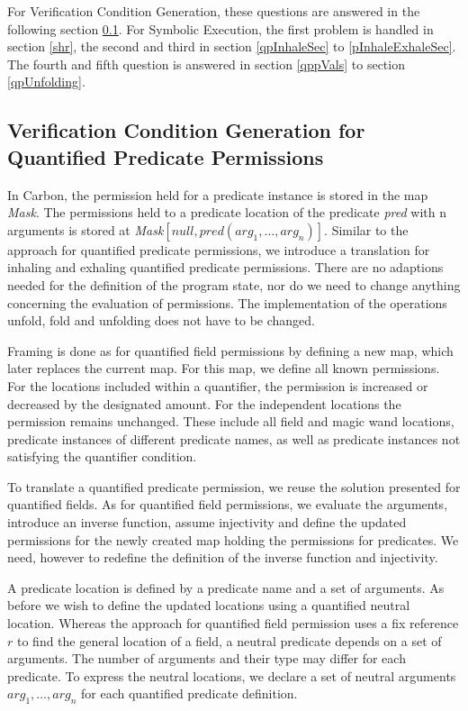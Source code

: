 \documentclass[12pt]{article}
\begin{document}
For Verification Condition Generation, these questions are answered in the following section \ref{vcgPredicate}. For Symbolic Execution, the first problem is handled in section \ref{shr}, the second and third in section \ref{qpInhaleSec} to \ref{pInhaleExhaleSec}. The fourth and fifth question is answered  in section \ref{qppVals} to section \ref{qpUnfolding}.

\subsection{Verification Condition Generation for Quantified Predicate Permissions}
\label{vcgPredicate}
In Carbon, the permission held for a predicate instance is stored in the map \textit{Mask}. The permissions held to a predicate location of the predicate \textit{pred} with n arguments is stored at \textit{Mask}\([null, pred(arg_1, \dots, arg_n)]\). Similar to the approach for quantified predicate permissions, we introduce a translation for inhaling and exhaling quantified predicate permissions. There are no adaptions needed for the definition of the program state, nor do we need to change anything concerning the evaluation of  permissions. The implementation of the operations unfold, fold and unfolding does not have to be changed. 

Framing is done as for quantified field permissions by defining a new map, which later replaces the current map. For this map, we define all known permissions. For the locations included within a quantifier, the permission is increased or decreased by the designated amount. For the independent locations the permission remains unchanged. These include all field and magic wand locations, predicate instances of different predicate names, as well as predicate instances not satisfying the quantifier condition.

To translate a quantified predicate permission, we reuse the solution presented for quantified fields. As for quantified field permissions, we evaluate the arguments, introduce an inverse function, assume injectivity and define the updated permissions for the newly created map holding the permissions for predicates. We need, however to redefine the definition of the inverse function and injectivity.

A predicate location is defined by a predicate name and a set of arguments. As before we wish to define the updated locations using a quantified neutral location. Whereas the approach for quantified field permission uses a fix reference \(r\) to find the general location of a field, a neutral predicate depends on a set of arguments. The number of arguments and their type may differ for each predicate. To express the neutral locations, we declare a set of neutral arguments \(arg_1, \dots, arg_n\) for each quantified predicate definition. 
\end{document}
